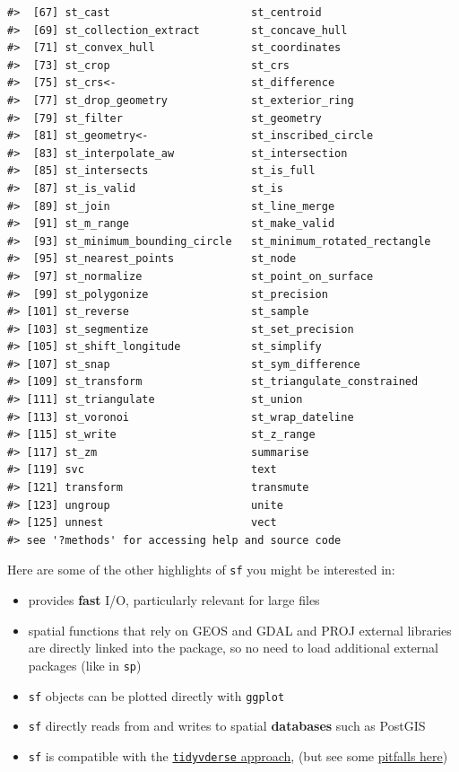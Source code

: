 \documentclass[
]{book}
\providecommand{\tightlist}{%
  \setlength{\itemsep}{0pt}\setlength{\parskip}{0pt}}
\begin{document}
\begin{verbatim}
#>  [67] st_cast                      st_centroid                 
#>  [69] st_collection_extract        st_concave_hull             
#>  [71] st_convex_hull               st_coordinates              
#>  [73] st_crop                      st_crs                      
#>  [75] st_crs<-                     st_difference               
#>  [77] st_drop_geometry             st_exterior_ring            
#>  [79] st_filter                    st_geometry                 
#>  [81] st_geometry<-                st_inscribed_circle         
#>  [83] st_interpolate_aw            st_intersection             
#>  [85] st_intersects                st_is_full                  
#>  [87] st_is_valid                  st_is                       
#>  [89] st_join                      st_line_merge               
#>  [91] st_m_range                   st_make_valid               
#>  [93] st_minimum_bounding_circle   st_minimum_rotated_rectangle
#>  [95] st_nearest_points            st_node                     
#>  [97] st_normalize                 st_point_on_surface         
#>  [99] st_polygonize                st_precision                
#> [101] st_reverse                   st_sample                   
#> [103] st_segmentize                st_set_precision            
#> [105] st_shift_longitude           st_simplify                 
#> [107] st_snap                      st_sym_difference           
#> [109] st_transform                 st_triangulate_constrained  
#> [111] st_triangulate               st_union                    
#> [113] st_voronoi                   st_wrap_dateline            
#> [115] st_write                     st_z_range                  
#> [117] st_zm                        summarise                   
#> [119] svc                          text                        
#> [121] transform                    transmute                   
#> [123] ungroup                      unite                       
#> [125] unnest                       vect                        
#> see '?methods' for accessing help and source code
\end{verbatim}

Here are some of the other highlights of \texttt{sf} you might be interested in:

\begin{itemize}
\tightlist
\item
  provides \textbf{fast} I/O, particularly relevant for large files
\item
  spatial functions that rely on GEOS and GDAL and PROJ external libraries are directly linked into the package, so no need to load additional external packages (like in \texttt{sp})
\item
  \texttt{sf} objects can be plotted directly with \texttt{ggplot}
\item
  \texttt{sf} directly reads from and writes to spatial \textbf{databases} such as PostGIS
\item
  \texttt{sf} is compatible with the \href{https://www.tidyverse.org/}{\texttt{tidyvderse} approach}, (but see some \href{https://geocompr.github.io/geocompkg/articles/tidyverse-pitfalls.html}{pitfalls here})
\end{itemize}
\end{document}
